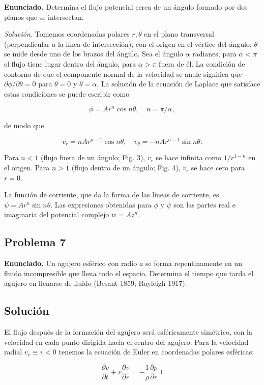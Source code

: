 \documentclass{article}
\begin{document}
\textbf{Enunciado.} Determina el flujo potencial cerca de un ángulo formado por dos planos que se intersectan.

\textit{Solución.} Tomemos coordenadas polares $r, \theta$ en el plano transversal (perpendicular a la línea de intersección), con el origen en el vértice del ángulo; $\theta$ se mide desde uno de los brazos del ángulo. Sea el ángulo $\alpha$ radianes; para $\alpha < \pi$ el flujo tiene lugar dentro del ángulo, para $\alpha > \pi$ fuera de él. La condición de contorno de que el componente normal de la velocidad se anule significa que $\partial \phi/\partial \theta = 0$ para $\theta = 0$ y $\theta = \alpha$. La solución de la ecuación de Laplace que satisface estas condiciones se puede escribir como

$$
\phi = Ar^n \cos n\theta, \quad n = \pi/\alpha,
$$

de modo que

$$
v_r = nAr^{n-1} \cos n\theta, \quad v_\theta = -nAr^{n-1} \sin n\theta.
$$

Para $n < 1$ (flujo fuera de un ángulo; Fig. 3), $v_r$ se hace infinita como $1/r^{1-n}$ en el origen. Para $n > 1$ (flujo dentro de un ángulo; Fig. 4), $v_r$ se hace cero para $r = 0$.

La función de corriente, que da la forma de las líneas de corriente, es $\psi = Ar^n \sin n\theta$. Las expresiones obtenidas para $\phi$ y $\psi$ son las partes real e imaginaria del potencial complejo $w = Az^n$.

\subsection*{Problema 7}

\textbf{Enunciado.} Un agujero esférico con radio $a$ se forma repentinamente en un fluido incompresible que llena todo el espacio. Determina el tiempo que tarda el agujero en llenarse de fluido (Besant 1859; Rayleigh 1917).

\subsection*{Solución}

El flujo después de la formación del agujero será esféricamente simétrico, con la velocidad en cada punto dirigida hacia el centro del agujero. Para la velocidad radial $v_r \equiv v < 0$ tenemos la ecuación de Euler en coordenadas polares esféricas:

$$
\frac{\partial v}{\partial t} + v \frac{\partial v}{\partial r} = -\frac{1}{\rho} \frac{\partial p}{\partial r}. {1}
$$
\end{document}
